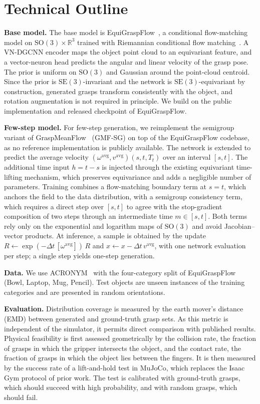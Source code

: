 \documentclass[conference]{IEEEtran}
\newcommand{\SO}{\mathrm{SO}(3)}
\newcommand{\SE}{\mathrm{SE}(3)}
\newcommand{\avg}{\mathrm{avg}}
\begin{document}
\section{Technical Outline}

\textbf{Base model.} The base model is EquiGraspFlow~\cite{lim2024equigraspflow}, a conditional flow-matching model
on $\SO \times \mathbb{R}^3$ trained with Riemannian conditional flow
matching~\cite{lipman2023flowmatching,chen2024riemannianfm}. A VN-DGCNN encoder maps the object point cloud to an
equivariant feature, and a vector-neuron head predicts the angular and linear velocity of the grasp pose. The prior
is uniform on $\SO$ and Gaussian around the point-cloud centroid. Since the prior is $\SE$-invariant and the network
is $\SE$-equivariant by construction, generated grasps transform consistently with the object, and rotation
augmentation is not required in principle. We build on the public implementation and released checkpoint of
EquiGraspFlow.

\textbf{Few-step model.} For few-step generation, we reimplement the semigroup variant of
GraspMeanFlow~\cite{kwon2026graspmeanflow} (GMF-SG) on top of the EquiGraspFlow codebase, as no reference
implementation is publicly available. The network is extended to predict the average velocity
$(\omega^\avg, v^\avg)(s, t, T_t)$ over an interval $[s, t]$. The additional time input $h = t - s$ is injected
through the existing equivariant time-lifting mechanism, which preserves equivariance and adds a negligible number
of parameters. Training combines a flow-matching boundary term at $s = t$, which anchors the field to the data
distribution, with a semigroup consistency term, which requires a direct step over $[s, t]$ to agree with the
stop-gradient composition of two steps through an intermediate time $m \in [s, t]$. Both terms rely only on the
exponential and logarithm maps of $\SO$ and avoid Jacobian--vector products. At inference, a sample is obtained by
the update $R \leftarrow \exp(-\Delta t\,[\omega^\avg])\,R$ and $x \leftarrow x - \Delta t\, v^\avg$, with one
network evaluation per step; a single step yields one-step generation.

\textbf{Data.} We use ACRONYM~\cite{eppner2021acronym} with the four-category split of EquiGraspFlow (Bowl, Laptop,
Mug, Pencil). Test objects are unseen instances of the training categories and are presented in random
orientations.

\textbf{Evaluation.} Distribution coverage is measured by the earth mover's distance (EMD) between generated and
ground-truth grasp sets. As this metric is independent of the simulator, it permits direct comparison with
published results. Physical feasibility is first assessed geometrically by the collision rate, the fraction of
grasps in which the gripper intersects the object, and the contact rate, the fraction of grasps in which the object
lies between the fingers. It is then measured by the success rate of a lift-and-hold test in MuJoCo, which replaces
the Isaac Gym protocol of prior work. The test is calibrated with ground-truth grasps, which should succeed with
high probability, and with random grasps, which should fail.
\end{document}

